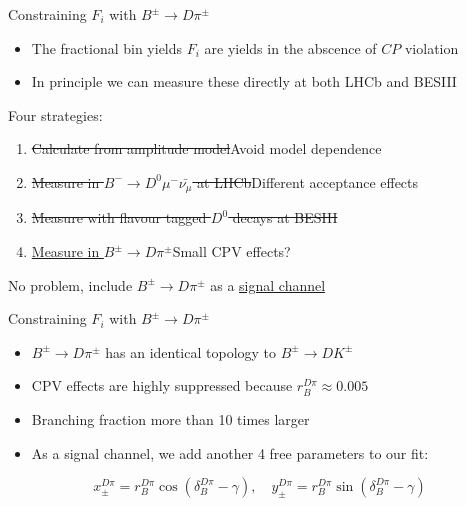 \documentclass{beamer}
\begin{document}
\begin{frame}{Constraining $F_i$ with $B^\pm\to D\pi^\pm$}
  \begin{itemize}
    \setlength\itemsep{1.0em}
    \item{The fractional bin yields $F_i$ are yields in the abscence of $C\!P$ violation}
    \item{In principle we can measure these directly at both LHCb and BESIII}
  \end{itemize}
  \begin{center}
    Four strategies:
  \end{center}
  \begin{enumerate}
    \setlength\itemsep{1.0em}
    \item{\sout{Calculate from amplitude model}\quad Avoid model dependence}
    \item{\sout{Measure in $B^-\to D^0\mu^-\bar{\nu_\mu}$ at LHCb}\quad Different acceptance effects}
    \item{\sout{Measure with flavour tagged $D^0$ decays at BESIII}}
    \item{\underline{Measure in $B^\pm\to D\pi^\pm$}\quad Small CPV effects?}
  \end{enumerate}
  \vspace{0.1cm}
  \begin{center}
    No problem, include $B^\pm\to D\pi^\pm$ as a \underline{signal channel}
  \end{center}
\end{frame}

\begin{frame}{Constraining $F_i$ with $B^\pm\to D\pi^\pm$}
  \begin{itemize}
    \setlength\itemsep{1.5em}
    \item{$B^\pm\to D\pi^\pm$ has an identical topology to $B^\pm\to DK^\pm$}
    \item{CPV effects are highly suppressed because $r_B^{D\pi}\approx0.005$}
    \item{Branching fraction more than 10 times larger}
    \item{As a signal channel, we add another 4 free parameters to our fit:}
  \end{itemize}
  \begin{equation*}
    x_\pm^{D\pi} = r_B^{D\pi}\cos(\delta_B^{D\pi} - \gamma),\quad y_\pm^{D\pi} = r_B^{D\pi}\sin(\delta_B^{D\pi} - \gamma)
  \end{equation*}
\end{frame}
\end{document}
